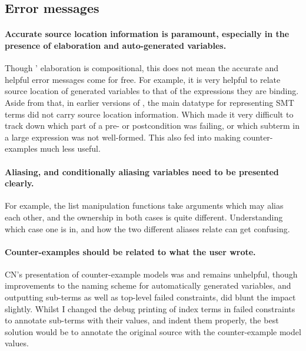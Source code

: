 \subsection{Error messages}

\paragraph{Accurate source location information is paramount, especially in the
presence of elaboration and auto-generated variables.} Though '
elaboration is compositional, this does not mean the accurate and helpful error
messages come for free. For example, it is very helpful to relate source
location of generated variables to that of the expressions they are
binding. Aside from that, in earlier versions of , the main datatype
for representing SMT terms did not carry source location information. Which
made it very difficult to track down which part of a pre- or postcondition was
failing, or which subterm in a large expression was not well-formed. This also
fed into making counter-examples much less useful.

\paragraph{Aliasing, and conditionally aliasing variables need to be presented
clearly.} For example, the list manipulation functions take arguments which may
alias each other, and the ownership in both cases is quite different.
Understanding which case one is in, and how the two different aliases relate
can get confusing.

\paragraph{Counter-examples should be related to what the user wrote.} CN's
presentation of counter-example models was and remains unhelpful, though
improvements to the naming scheme for automatically generated variables, and
outputting sub-terms as well as top-level failed constraints, did blunt the
impact slightly. Whilst I changed the debug printing of index terms in failed
constraints to annotate sub-terms with their values, and indent them properly,
the best solution would be to annotate the original source with the
counter-example model values.

